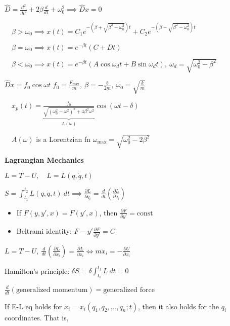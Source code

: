 \documentclass[twocolumn]{article}
\begin{document}
$\hat{D} = \frac{d^2}{dt^2} + 2 \beta \frac{d}{dt} + \omega_0^2 \implies \hat{D} x = 0$

$\quad \beta > \omega_0 \implies x(t) = C_1 e^{- \left(\beta + \sqrt{\beta^2 - \omega_0^2} \right) t} + C_2 e^{-\left(\beta - \sqrt{\beta^2 - \omega_0^2} \right) t}$

$\quad \beta = \omega_0 \implies x(t) = e^{-\beta t} (C+Dt)$

$\quad \beta < \omega_0 \implies x(t) = e^{-\beta t} (A \cos \omega_d t + B \sin \omega_d t),\ \omega_d = \sqrt{\omega_0^2 - \beta^2}$

\vspace{-.5em}
\dotfill

$\hat{D} x =  f_0 \cos \omega t$ \hfill $f_0 = \frac{F_{\text{max}}}{m},\ \beta = -\frac{b}{2m},\ \omega_0 = \sqrt{\frac{k}{m}}$

$\quad x_p(t) = \underbrace{\frac{f_0}{\sqrt{(\omega_0^2 - \omega^2)^2 + 4 \beta^2 \omega^2}}}_{A(\omega)} \cos(\omega t - \delta)$

$\quad A(\omega)$ is a Lorentzian fn \hfill $\omega_{\text{max}} = \sqrt{\omega_0^2 - 2 \beta^2}$

\vspace{-.5em}
\dotfill

\textbf{Lagrangian Mechanics}

$L = T - U,\quad L = L(q, \dot{q}, t)$

$S = \int_{t_1}^{t_2} L(q, \dot{q}, t)\ dt \implies \frac{\partial L}{\partial q_i} = \frac{d}{dt} \left( \frac{\partial L}{\partial \dot{q}_i} \right)$

\vspace{-.5em} \begin{itemize}
    \item If $F(y, y', x) = F(y', x)$, then $\frac{\partial F}{\partial y'} = \text{const}$
    \item Beltrami identity: $F - y' \frac{\partial F}{\partial y'} = C$
\end{itemize} \vspace{-.5em}

$L = T - U,\ \frac{d}{dt} \left( \frac{\partial L}{\partial \dot{x}_i} \right) = \frac{\partial L}{\partial x_i} \iff m \ddot{x}_i = -\frac{\partial U}{\partial x_i}$

Hamilton's principle: $\delta S = \delta \int_{t_0}^{t_f} L\ dt = 0$

$\frac{d}{dt} (\text{generalized momentum}) = \text{generalized force}$

If E-L eq holds for $x_i = x_i(q_1, q_2, \dots, q_n; t)$, then it also holds for the $q_i$ coordinates. That is,
\end{document}
